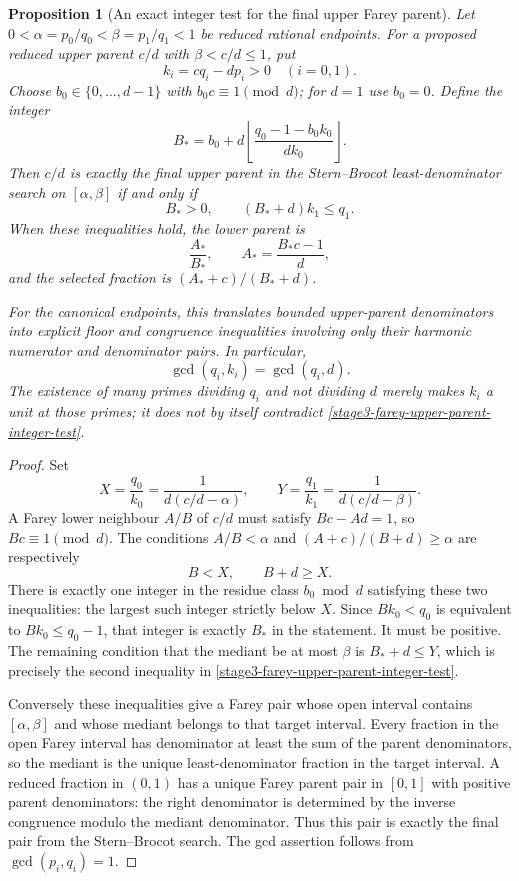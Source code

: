 \documentclass[11pt,a4paper]{article}
\newtheorem{proposition}[theorem]{Proposition}
\theoremstyle{definition}
\theoremstyle{remark}
\begin{document}
\begin{proposition}[An exact integer test for the final upper Farey parent]
\label{stage3-farey-upper-parent-test}
Let $0<\alpha=p_0/q_0<\beta=p_1/q_1<1$ be reduced rational endpoints.
For a proposed reduced upper parent $c/d$ with
$\beta<c/d\le1$, put
\[
 k_i=cq_i-dp_i>0\quad(i=0,1).
\]
Choose $b_0\in\{0,\ldots,d-1\}$ with $b_0c\equiv1\pmod d$;
for $d=1$ use $b_0=0$. Define the integer
\[
 B_*=b_0+d\left\lfloor
       \frac{q_0-1-b_0k_0}{dk_0}
       \right\rfloor.
\]
Then $c/d$ is exactly the final upper parent in the Stern--Brocot
least-denominator search on $[\alpha,\beta]$ if and only if
\begin{equation}\label{stage3-farey-upper-parent-integer-test}
 B_*>0,\qquad (B_*+d)k_1\le q_1.
\end{equation}
When these inequalities hold, the lower parent is
\[
 \frac{A_*}{B_*},\qquad A_*=\frac{B_*c-1}{d},
\]
and the selected fraction is
$(A_*+c)/(B_*+d)$.

For the canonical endpoints, this translates bounded upper-parent
denominators into explicit floor and congruence inequalities involving
only their harmonic numerator and denominator pairs. In particular,
\[
 \gcd(q_i,k_i)=\gcd(q_i,d).
\]
The existence of many primes dividing $q_i$ and not dividing $d$ merely
makes $k_i$ a unit at those primes; it does not by itself contradict
\eqref{stage3-farey-upper-parent-integer-test}.
\end{proposition}

\begin{proof}
Set
\[
 X=\frac{q_0}{k_0}=\frac1{d(c/d-\alpha)},\qquad
 Y=\frac{q_1}{k_1}=\frac1{d(c/d-\beta)}.
\]
A Farey lower neighbour $A/B$ of $c/d$ must satisfy
$Bc-Ad=1$, so $Bc\equiv1\pmod d$.
The conditions $A/B<\alpha$ and
$(A+c)/(B+d)\ge\alpha$ are respectively
\[
 B<X,\qquad B+d\ge X.
\]
There is exactly one integer in the residue class $b_0\bmod d$
satisfying these two inequalities: the largest such integer strictly
below $X$. Since $Bk_0<q_0$ is equivalent to $Bk_0\le q_0-1$,
that integer is exactly $B_*$ in the statement.
It must be positive. The remaining condition that the mediant be at
most $\beta$ is $B_*+d\le Y$, which is precisely the second inequality
in \eqref{stage3-farey-upper-parent-integer-test}.

Conversely these inequalities give a Farey pair whose open interval
contains $[\alpha,\beta]$ and whose mediant belongs to that target
interval. Every fraction in the open Farey interval has denominator at
least the sum of the parent denominators, so the mediant is the unique
least-denominator fraction in the target interval. A reduced fraction
in $(0,1)$ has a unique Farey parent pair in $[0,1]$ with positive parent
denominators: the right denominator is determined by the inverse
congruence modulo the mediant denominator. Thus this pair is exactly
the final pair from the Stern--Brocot search.
The gcd assertion follows from $\gcd(p_i,q_i)=1$.
\end{proof}
\end{document}
